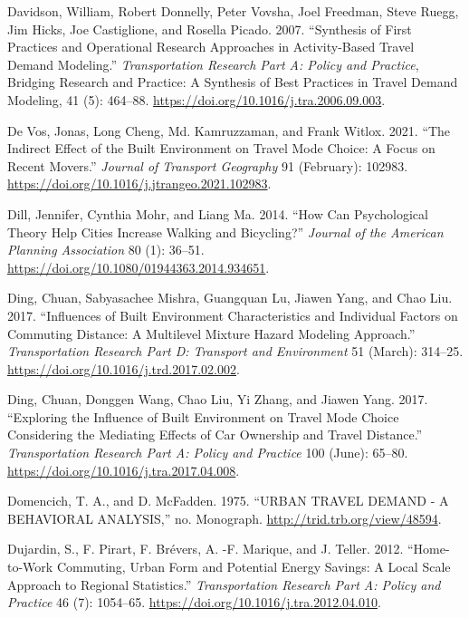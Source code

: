 \documentclass[
  12pt,
]{article}
\newlength{\cslhangindent}
\newlength{\cslentryspacingunit} %
\newenvironment{CSLReferences}[2] %
 {%
  \setlength{\parindent}{0pt}
  \ifodd #1
  \let\oldpar\par
  \def\par{\hangindent=\cslhangindent\oldpar}
  \fi
  \setlength{\parskip}{#2\cslentryspacingunit}
 }%
 {}
\begin{document}
\begin{CSLReferences}{1}{0}
\leavevmode{}%
Davidson, William, Robert Donnelly, Peter Vovsha, Joel Freedman, Steve Ruegg, Jim Hicks, Joe Castiglione, and Rosella Picado. 2007. {``Synthesis of First Practices and Operational Research Approaches in Activity-Based Travel Demand Modeling.''} \emph{Transportation Research Part A: Policy and Practice}, Bridging {Research} and {Practice}: {A Synthesis} of {Best Practices} in {Travel Demand Modeling}, 41 (5): 464--88. \url{https://doi.org/10.1016/j.tra.2006.09.003}.

\leavevmode{}%
De Vos, Jonas, Long Cheng, Md. Kamruzzaman, and Frank Witlox. 2021. {``The Indirect Effect of the Built Environment on Travel Mode Choice: {A} Focus on Recent Movers.''} \emph{Journal of Transport Geography} 91 (February): 102983. \url{https://doi.org/10.1016/j.jtrangeo.2021.102983}.

\leavevmode{}%
Dill, Jennifer, Cynthia Mohr, and Liang Ma. 2014. {``How {Can Psychological Theory Help Cities Increase Walking} and {Bicycling}?''} \emph{Journal of the American Planning Association} 80 (1): 36--51. \url{https://doi.org/10.1080/01944363.2014.934651}.

\leavevmode{}%
Ding, Chuan, Sabyasachee Mishra, Guangquan Lu, Jiawen Yang, and Chao Liu. 2017. {``Influences of Built Environment Characteristics and Individual Factors on Commuting Distance: {A} Multilevel Mixture Hazard Modeling Approach.''} \emph{Transportation Research Part D: Transport and Environment} 51 (March): 314--25. \url{https://doi.org/10.1016/j.trd.2017.02.002}.

\leavevmode{}%
Ding, Chuan, Donggen Wang, Chao Liu, Yi Zhang, and Jiawen Yang. 2017. {``Exploring the Influence of Built Environment on Travel Mode Choice Considering the Mediating Effects of Car Ownership and Travel Distance.''} \emph{Transportation Research Part A: Policy and Practice} 100 (June): 65--80. \url{https://doi.org/10.1016/j.tra.2017.04.008}.

\leavevmode{}%
Domencich, T. A., and D. McFadden. 1975. {``{URBAN TRAVEL DEMAND} - {A BEHAVIORAL ANALYSIS},''} no. Monograph. \url{http://trid.trb.org/view/48594}.

\leavevmode{}%
Dujardin, S., F. Pirart, F. Brévers, A. -F. Marique, and J. Teller. 2012. {``Home-to-Work Commuting, Urban Form and Potential Energy Savings: {A} Local Scale Approach to Regional Statistics.''} \emph{Transportation Research Part A: Policy and Practice} 46 (7): 1054--65. \url{https://doi.org/10.1016/j.tra.2012.04.010}.


\end{CSLReferences}
\end{document}
